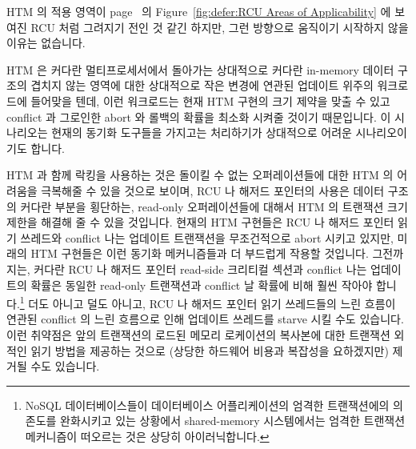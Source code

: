HTM 의 적용 영역이
page~\pageref{fig:defer:RCU Areas of Applicability} 의
Figure~\ref{fig:defer:RCU Areas of Applicability} 에 보여진 RCU 처럼 그려지기
전인 것 같긴 하지만, 그런 방향으로 움직이기 시작하지 않을 이유는 없습니다.

HTM 은 커다란 멀티프로세서에서 돌아가는 상대적으로 커다란 in-memory 데이터
구조의 겹치지 않는 영역에 대한 상대적으로 작은 변경에 연관된 업데이트 위주의
워크로드에 들어맞을 텐데, 이런 워크로드는 현재 HTM 구현의 크기 제약을 맞출 수
있고 conflict 과 그로인한 abort 와 롤백의 확률을 최소화 시켜줄 것이기
때문입니다.
이 시나리오는 현재의 동기화 도구들을 가지고는 처리하기가 상대적으로 어려운
시나리오이기도 합니다.
\iffalse

Although it will likely be some time before HTM's area of applicability
can be as crisply delineated as that shown for RCU in
Figure~\ref{fig:defer:RCU Areas of Applicability} on
page~\pageref{fig:defer:RCU Areas of Applicability}, that is no reason not to
start moving in that direction.

HTM seems best suited to update-heavy workloads involving relatively
small changes to disparate portions of relatively large in-memory
data structures running on large multiprocessors,
as this meets the size restrictions of current HTM implementations while
minimizing the probability of conflicts and attendant aborts and
rollbacks.
This scenario is also one that is relatively difficult to handle given
current synchronization primitives.
\fi

HTM 과 함께 락킹을 사용하는 것은 돌이킬 수 없는 오퍼레이션들에 대한 HTM 의
어려움을 극복해줄 수 있을 것으로 보이며, RCU 나 해저드 포인터의 사용은 데이터
구조의 커다란 부분을 횡단하는, read-only 오퍼레이션들에 대해서 HTM 의 트랜잭션
크기 제한을 해결해 줄 수 있을 것입니다.
현재의 HTM 구현들은 RCU 나 해저드 포인터 읽기 쓰레드와 conflict 나는 업데이트
트랜잭션을 무조건적으로 abort 시키고 있지만, 미래의 HTM 구현들은 이런 동기화
메커니즘들과 더 부드럽게 작용할 것입니다.
그전까지는, 커다란 RCU 나 해저드 포인터 read-side 크리티컬 섹션과 conflict 나는
업데이트의 확률은 동일한 read-only 트랜잭션과 conflict 날 확률에 비해 훨씬
작아야 합니다.\footnote{
	NoSQL 데이터베이스들이 데이터베이스 어플리케이션의 엄격한 트랜잭션에의
	의존도를 완화시키고 있는 상황에서 shared-memory 시스템에서는 엄격한
	트랜잭션 메커니즘이 떠오르는 것은 상당히 아이러닉합니다.}
더도 아니고 덜도 아니고, RCU 나 해저드 포인터 읽기 쓰레드들의 느린 흐름이
연관된 conflict 의 느린 흐름으로 인해 업데이트 쓰레드를 starve 시킬 수도
있습니다.
이런 취약점은 앞의 트랜잭션의 로드된 메모리 로케이션의 복사본에 대한 트랜잭션
외적인 읽기 방법을 제공하는 것으로 (상당한 하드웨어 비용과 복잡성을 요하겠지만)
제거될 수도 있습니다.
\iffalse

